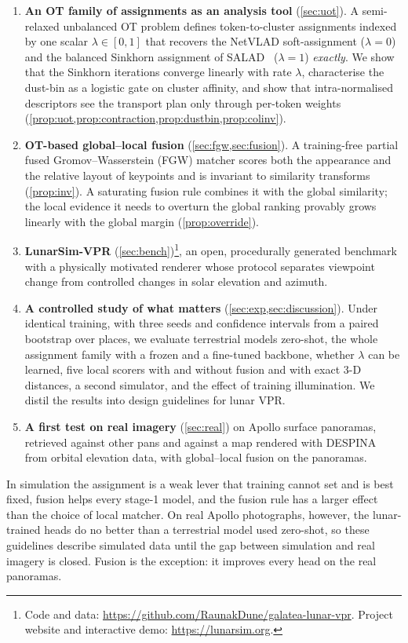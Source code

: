 \begin{enumerate}
\item \textbf{An OT family of assignments as an analysis tool} (\cref{sec:uot}). A semi-relaxed
unbalanced OT problem defines token-to-cluster assignments indexed by one scalar $\lambda\in[0,1]$ that
recovers the NetVLAD soft-assignment ($\lambda=0$) and the balanced Sinkhorn assignment of
SALAD~\cite{izquierdo2024optimal} ($\lambda=1$) \emph{exactly}. We show that the Sinkhorn iterations
converge linearly with rate $\lambda$, characterise the dust-bin as a logistic gate on cluster
affinity, and show that intra-normalised descriptors see the transport plan only through per-token
weights (\cref{prop:uot,prop:contraction,prop:dustbin,prop:colinv}).
\item \textbf{OT-based global--local fusion} (\cref{sec:fgw,sec:fusion}). A training-free partial
fused Gromov--Wasserstein (FGW) matcher scores both the appearance and the relative layout of keypoints
and is invariant to similarity transforms (\cref{prop:inv}). A saturating fusion rule combines it with
the global similarity; the local evidence it needs to overturn the global ranking provably grows
linearly with the global margin (\cref{prop:override}).
\item \textbf{LunarSim-VPR} (\cref{sec:bench})\footnote{Code and data: \url{https://github.com/RaunakDune/galatea-lunar-vpr}. Project website and interactive demo: \url{https://lunarsim.org}.}, an open, procedurally generated benchmark
with a physically motivated renderer whose protocol separates viewpoint change from controlled
changes in solar elevation and azimuth.
\item \textbf{A controlled study of what matters} (\cref{sec:exp,sec:discussion}). Under identical
training, with three seeds and confidence intervals from a paired bootstrap over places, we evaluate
terrestrial models zero-shot, the whole assignment family with a frozen and a fine-tuned backbone,
whether $\lambda$ can be learned, five local scorers with and without fusion and with exact 3-D
distances, a second simulator, and the effect of
training illumination. We distil the results into design
guidelines for lunar VPR.
\item \textbf{A first test on real imagery} (\cref{sec:real}) on Apollo surface panoramas, retrieved
against other pans and against a map rendered with DESPINA from orbital elevation data, with
global--local fusion on the panoramas.
\end{enumerate}

In simulation the assignment is a weak lever that training cannot set and is best fixed, fusion helps
every stage-1 model, and the fusion rule has a larger effect than the choice of local matcher. On real
Apollo photographs, however, the
lunar-trained heads do no better than a terrestrial model used zero-shot, so these guidelines describe
simulated data until the gap between simulation and real imagery is closed. Fusion is the exception: it
improves every head on the real panoramas.

